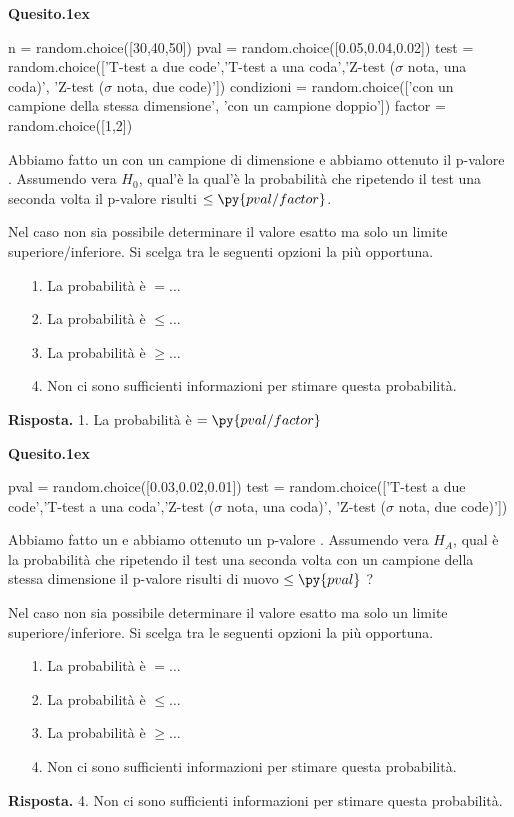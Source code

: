 \documentclass[11pt,twoside,a4paper]{article}
\newenvironment{question}{\bigskip\par\textbf{Quesito.\kern1ex}}{\vspace{\parskip}}
\newenvironment{answer}{\par\textbf{Risposta.\quad}}{}
\begin{document}
\begin{question}
\begin{pycode}
n = random.choice([30,40,50])
pval = random.choice([0.05,0.04,0.02])
test = random.choice(['T-test a due code','T-test a una coda','Z-test ($\sigma$ nota, una coda)', 'Z-test ($\sigma$ nota, due code)'])
condizioni  = random.choice(['con un campione della stessa dimensione', 'con un campione doppio'])
factor =  random.choice([1,2])
\end{pycode}
Abbiamo fatto un  con un campione di dimensione  e abbiamo ottenuto il p-valore .
Assumendo vera $H_0$, qual'\`e la  qual'è la probabilità che ripetendo il test una seconda volta  il p-valore risulti $\le\py{pval/factor}$.

Nel caso non sia possibile determinare il valore esatto ma solo un limite superiore/inferiore. Si scelga tra le seguenti opzioni la più opportuna.
\begin{itemize}
\item[1.] La probabilità è $=\dots$
\item[2.] La probabilità è $\le\dots$
\item[3.] La probabilità è $\ge\dots$
\item[4.] Non ci sono sufficienti informazioni per stimare questa probabilità.
\end{itemize}
\begin{answer}
1. La probabilità è $=\py{pval/factor}$
\end{answer}
\end{question}









\begin{question}
\begin{pycode}
pval = random.choice([0.03,0.02,0.01])
test = random.choice(['T-test a due code','T-test a una coda','Z-test ($\sigma$ nota, una coda)', 'Z-test ($\sigma$ nota, due code)'])
\end{pycode}
Abbiamo fatto un  e abbiamo ottenuto un p-valore .
Assumendo vera $H_A$, qual è la probabilità che ripetendo il test una seconda volta con un campione della stessa dimensione il p-valore risulti di nuovo $\le\py{pval}$ ?

Nel caso non sia possibile determinare il valore esatto ma solo un limite superiore/inferiore. Si scelga tra le seguenti opzioni la più opportuna.
\begin{itemize}
\item[1.] La probabilità è $=\dots$
\item[2.] La probabilità è $\le\dots$
\item[3.] La probabilità è $\ge\dots$
\item[4.] Non ci sono sufficienti informazioni per stimare questa probabilità.
\end{itemize}
\begin{answer}
4. Non ci sono sufficienti informazioni per stimare questa probabilità.
\end{answer}
\end{question}
\end{document}
